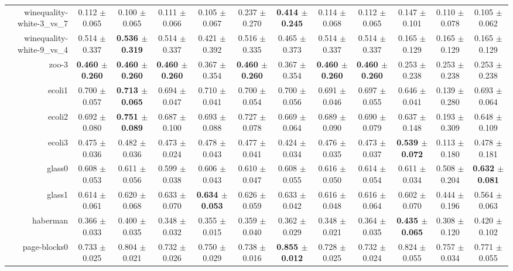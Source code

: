 \begin{table}[!ht]
{\begin{tabular}{r c c c c c c c c c c c}
winequality-white-3\_vs\_7 & 0.112 $\pm$ 0.065 & 0.100 $\pm$ 0.065 & 0.111 $\pm$ 0.066 & 0.105 $\pm$ 0.067 & 0.237 $\pm$ 0.270 & \textbf{0.414 $\pm$ 0.245} & 0.114 $\pm$ 0.068 & 0.112 $\pm$ 0.065 & 0.147 $\pm$ 0.101 & 0.110 $\pm$ 0.078 & 0.105 $\pm$ 0.062 \\
winequality-white-9\_vs\_4 & 0.514 $\pm$ 0.337 & \textbf{0.536 $\pm$ 0.319} & 0.514 $\pm$ 0.337 & 0.421 $\pm$ 0.392 & 0.516 $\pm$ 0.335 & 0.465 $\pm$ 0.373 & 0.514 $\pm$ 0.337 & 0.514 $\pm$ 0.337 & 0.165 $\pm$ 0.129 & 0.165 $\pm$ 0.129 & 0.165 $\pm$ 0.129 \\
zoo-3 & \textbf{0.460 $\pm$ 0.260} & \textbf{0.460 $\pm$ 0.260} & \textbf{0.460 $\pm$ 0.260} & 0.367 $\pm$ 0.354 & \textbf{0.460 $\pm$ 0.260} & 0.367 $\pm$ 0.354 & \textbf{0.460 $\pm$ 0.260} & \textbf{0.460 $\pm$ 0.260} & 0.253 $\pm$ 0.238 & 0.253 $\pm$ 0.238 & 0.253 $\pm$ 0.238 \\
ecoli1 & 0.700 $\pm$ 0.057 & \textbf{0.713 $\pm$ 0.065} & 0.694 $\pm$ 0.047 & 0.710 $\pm$ 0.041 & 0.700 $\pm$ 0.054 & 0.700 $\pm$ 0.056 & 0.691 $\pm$ 0.046 & 0.697 $\pm$ 0.055 & 0.646 $\pm$ 0.041 & 0.139 $\pm$ 0.280 & 0.693 $\pm$ 0.064 \\
ecoli2 & 0.692 $\pm$ 0.080 & \textbf{0.751 $\pm$ 0.089} & 0.687 $\pm$ 0.100 & 0.693 $\pm$ 0.088 & 0.727 $\pm$ 0.078 & 0.669 $\pm$ 0.064 & 0.689 $\pm$ 0.090 & 0.690 $\pm$ 0.079 & 0.637 $\pm$ 0.148 & 0.193 $\pm$ 0.309 & 0.648 $\pm$ 0.109 \\
ecoli3 & 0.475 $\pm$ 0.036 & 0.482 $\pm$ 0.036 & 0.473 $\pm$ 0.024 & 0.478 $\pm$ 0.043 & 0.477 $\pm$ 0.041 & 0.424 $\pm$ 0.034 & 0.476 $\pm$ 0.035 & 0.473 $\pm$ 0.037 & \textbf{0.539 $\pm$ 0.072} & 0.113 $\pm$ 0.180 & 0.478 $\pm$ 0.181 \\
glass0 & 0.608 $\pm$ 0.053 & 0.611 $\pm$ 0.056 & 0.599 $\pm$ 0.038 & 0.606 $\pm$ 0.043 & 0.610 $\pm$ 0.047 & 0.608 $\pm$ 0.055 & 0.616 $\pm$ 0.050 & 0.614 $\pm$ 0.054 & 0.611 $\pm$ 0.034 & 0.508 $\pm$ 0.204 & \textbf{0.632 $\pm$ 0.081} \\
glass1 & 0.614 $\pm$ 0.061 & 0.620 $\pm$ 0.068 & 0.633 $\pm$ 0.070 & \textbf{0.634 $\pm$ 0.053} & 0.626 $\pm$ 0.059 & 0.633 $\pm$ 0.042 & 0.616 $\pm$ 0.048 & 0.616 $\pm$ 0.064 & 0.602 $\pm$ 0.070 & 0.444 $\pm$ 0.196 & 0.564 $\pm$ 0.063 \\
haberman & 0.366 $\pm$ 0.033 & 0.400 $\pm$ 0.035 & 0.348 $\pm$ 0.032 & 0.355 $\pm$ 0.015 & 0.359 $\pm$ 0.040 & 0.362 $\pm$ 0.029 & 0.348 $\pm$ 0.021 & 0.364 $\pm$ 0.035 & \textbf{0.435 $\pm$ 0.065} & 0.308 $\pm$ 0.120 & 0.420 $\pm$ 0.102 \\
page-blocks0 & 0.733 $\pm$ 0.025 & 0.804 $\pm$ 0.021 & 0.732 $\pm$ 0.026 & 0.750 $\pm$ 0.029 & 0.738 $\pm$ 0.016 & \textbf{0.855 $\pm$ 0.012} & 0.728 $\pm$ 0.025 & 0.732 $\pm$ 0.024 & 0.824 $\pm$ 0.055 & 0.757 $\pm$ 0.034 & 0.771 $\pm$ 0.055 \\

\end{tabular}}
\end{table}
